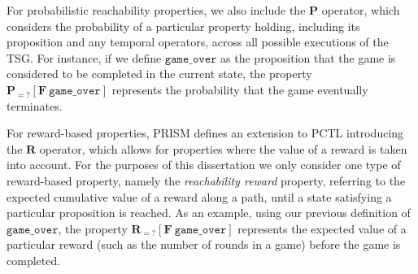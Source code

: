 For probabilistic reachability properties, we also include the $\mathbf{P}$ operator, which considers the probability of a particular property holding, including its proposition and any temporal operators, across all possible executions of the TSG. For instance, if we define $\mathtt{game\_over}$ as the proposition that the game is considered to be completed in the current state, the property $\mathbf{P}_{=?} [\mathbf{F}\ \mathtt{game\_over}]$ represents the probability that the game eventually terminates.

For reward-based properties, PRISM defines an extension to PCTL introducing the $\mathbf{R}$ operator, which allows for properties where the value of a reward is taken into account. For the purposes of this dissertation we only consider one type of reward-based property, namely the \emph{reachability reward} property, referring to the expected cumulative value of a reward along a path, until a state satisfying a particular proposition is reached. As an example, using our previous definition of $\mathtt{game\_over}$, the property $\mathbf{R}_{=?} [\mathbf{F}\ \mathtt{game\_over}]$ represents the expected value of a particular reward (such as the number of rounds in a game) before the game is completed.